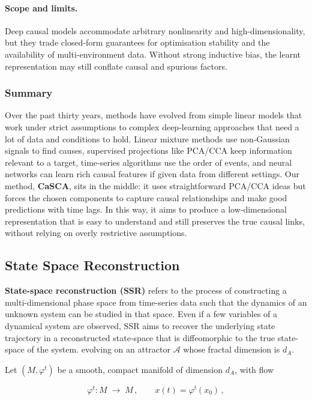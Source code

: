 \documentclass[14pt]{extarticle}
\begin{document}
	\paragraph{Scope and limits.}
	Deep causal models accommodate arbitrary nonlinearity and high-dimensionality, but they trade closed-form guarantees for optimisation stability and the availability of multi-environment data.  
	Without strong inductive bias, the learnt representation may still conflate causal and spurious factors.
	
	\subsubsection*{Summary}
	
	Over the past thirty years, methods have evolved from simple linear models that work under strict assumptions to complex deep‐learning approaches that need a lot of data and conditions to hold.  
	Linear mixture methods use non‐Gaussian signals to find causes, supervised projections like PCA/CCA keep information relevant to a target, time‐series algorithms use the order of events, and neural networks can learn rich causal features if given data from different settings.  
	Our method, \textbf{CaSCA}, sits in the middle: it uses straightforward PCA/CCA ideas but forces the chosen components to capture causal relationships and make good predictions with time lags.  
	In this way, it aims to produce a low‐dimensional representation that is easy to understand and still preserves the true causal links, without relying on overly restrictive assumptions.  
	
	\subsection{State Space Reconstruction}\label{sec:ssr}
	
	\textbf{State-space reconstruction (SSR)} refers to the process of constructing a multi-dimensional phase space from time-series data such that the dynamics of an unknown system can be studied in that space. 
	Even if a few variables of a dynamical system are observed, SSR aims to recover the underlying state trajectory  in a reconstructed state-space that is diffeomorphic to the true state-space of the system.
	evolving on an attractor $\mathcal{A}$ whose fractal dimension is $d_A$.  
	
	Let $(M, \varphi^t)$ be a smooth, compact manifold of dimension $d_A$, with flow
	
	$$
	\varphi^t\colon M\;\to\;M\,,\qquad x(t)=\varphi^t(x_0)\,,
	$$
	
\end{document}
